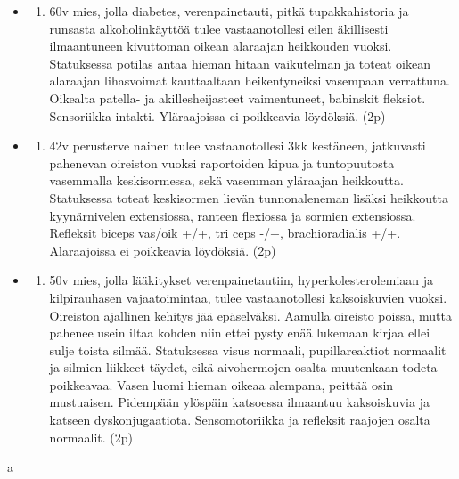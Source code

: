 \documentclass[
]{book}
\providecommand{\tightlist}{%
  \setlength{\itemsep}{0pt}\setlength{\parskip}{0pt}}
\begin{document}
\begin{itemize}
\tightlist
\item
  \begin{enumerate}
  \def\labelenumi{\alph{enumi}.}
  \tightlist
  \item
    60v mies, jolla diabetes, verenpainetauti, pitkä tupakkahistoria ja runsasta alkoholinkäyttöä tulee vastaanotollesi eilen äkillisesti ilmaantuneen kivuttoman oikean alaraajan heikkouden vuoksi. Statuksessa potilas antaa hieman hitaan vaikutelman ja toteat oikean alaraajan lihasvoimat kauttaaltaan heikentyneiksi vasempaan verrattuna. Oikealta patella- ja akillesheijasteet vaimentuneet, babinskit fleksiot. Sensoriikka intakti. Yläraajoissa ei poikkeavia löydöksiä. (2p)
  \end{enumerate}
\item
  \begin{enumerate}
  \def\labelenumi{\alph{enumi}.}
  \setcounter{enumi}{1}
  \tightlist
  \item
    42v perusterve nainen tulee vastaanotollesi 3kk kestäneen, jatkuvasti pahenevan oireiston vuoksi raportoiden kipua ja tuntopuutosta vasemmalla keskisormessa, sekä vasemman yläraajan heikkoutta. Statuksessa toteat keskisormen lievän tunnonaleneman lisäksi heikkoutta kyynärnivelen extensiossa, ranteen flexiossa ja sormien extensiossa. Refleksit biceps vas/oik +/+, tri ceps -/+, brachioradialis +/+. Alaraajoissa ei poikkeavia löydöksiä. (2p)
  \end{enumerate}
\item
  \begin{enumerate}
  \def\labelenumi{\alph{enumi}.}
  \setcounter{enumi}{2}
  \tightlist
  \item
    50v mies, jolla lääkitykset verenpainetautiin, hyperkolesterolemiaan ja kilpirauhasen vajaatoimintaa, tulee vastaanotollesi kaksoiskuvien vuoksi. Oireiston ajallinen kehitys jää epäselväksi. Aamulla oireisto poissa, mutta pahenee usein iltaa kohden niin ettei pysty enää lukemaan kirjaa ellei sulje toista silmää. Statuksessa visus normaali, pupillareaktiot normaalit ja silmien liikkeet täydet, eikä aivohermojen osalta muutenkaan todeta poikkeavaa. Vasen luomi hieman oikeaa alempana, peittää osin mustuaisen. Pidempään ylöspäin katsoessa ilmaantuu kaksoiskuvia ja katseen dyskonjugaatiota. Sensomotoriikka ja refleksit raajojen osalta normaalit. (2p)
  \end{enumerate}
\end{itemize}

a
\end{document}
